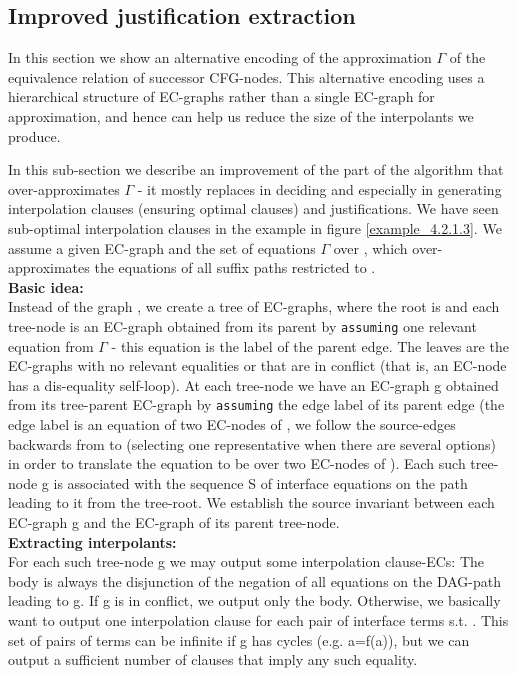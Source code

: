 
\subsection{Improved justification extraction}\label{appendix:gamma_approximation}
In this section we show an alternative encoding of the approximation $\Gamma$ of the equivalence relation of successor CFG-nodes.
This alternative encoding uses a hierarchical structure of EC-graphs rather than a single EC-graph for approximation, and hence can help us reduce the size of the interpolants we produce.

In this sub-section we describe an improvement of the part of the algorithm that over-approximates $\Gamma$ - 
it mostly replaces  in deciding \eqg{} and especially in generating interpolation clauses (ensuring optimal clauses) and justifications.
We have seen sub-optimal interpolation clauses in the example in figure \ref{example_4.2.1.3}.
We assume a given EC-graph  and the set of equations $\Gamma$ over , which over-approximates the equations of all suffix paths restricted to .\\
\textbf{Basic idea:}\\
Instead of the graph , we create a tree of EC-graphs, where the root is  and each tree-node is an EC-graph obtained from its parent by \lstinline|assuming| one relevant equation from $\Gamma$ - this equation is the label of the parent edge.
The leaves are the EC-graphs with no relevant equalities or that are in conflict (that is, an EC-node has a dis-equality self-loop).
At each tree-node we have an EC-graph g obtained from its tree-parent EC-graph by \lstinline|assuming| the edge label of its parent edge (the edge label is an equation of two EC-nodes of , we follow the source-edges backwards from  to  (selecting one representative when there are several options) in order to translate the equation to be over two EC-nodes of ).
Each such tree-node g is associated with the sequence S of interface equations on the path leading to it from the tree-root.
We establish the source invariant between each EC-graph g and the EC-graph  of its parent tree-node.\\
\textbf{Extracting interpolants:}\\
For each such tree-node g we may output some interpolation clause-ECs:
The body is always the disjunction of the negation of all equations on the DAG-path leading to g.
If g is in conflict, we output only the body.
Otherwise, we basically want to output one interpolation clause for each pair of interface terms  s.t. . This set of pairs of terms can be infinite if g has cycles (e.g. a=f(a)), but we can output a sufficient number of clauses that imply any such equality.\\
